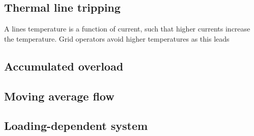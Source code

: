 \documentclass{article}
\begin{document}
\subsection{Thermal line tripping}

A lines temperature is a function of current, such that higher currents increase the temperature. Grid operators avoid higher temperatures as this leads

\subsection{Accumulated overload}

\subsection{Moving average flow}

\subsection{Loading-dependent system}
\end{document}
